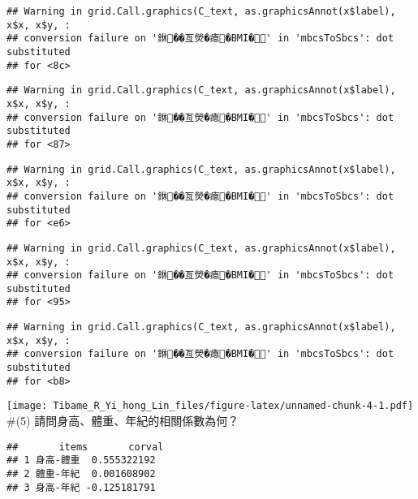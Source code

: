 \documentclass[
]{article}
\newenvironment{Shaded}{\begin{snugshade}}{\end{snugshade}}
\newcommand{\KeywordTok}[1]{\textcolor[rgb]{0.13,0.29,0.53}{\textbf{#1}}}
\newcommand{\NormalTok}[1]{#1}
\newcommand{\OperatorTok}[1]{\textcolor[rgb]{0.81,0.36,0.00}{\textbf{#1}}}
\newcommand{\StringTok}[1]{\textcolor[rgb]{0.31,0.60,0.02}{#1}}
\begin{document}
\begin{verbatim}
## Warning in grid.Call.graphics(C_text, as.graphicsAnnot(x$label), x$x, x$y, :
## conversion failure on '銝��亙熒�瘜�BMI�' in 'mbcsToSbcs': dot substituted
## for <8c>
\end{verbatim}

\begin{verbatim}
## Warning in grid.Call.graphics(C_text, as.graphicsAnnot(x$label), x$x, x$y, :
## conversion failure on '銝��亙熒�瘜�BMI�' in 'mbcsToSbcs': dot substituted
## for <87>
\end{verbatim}

\begin{verbatim}
## Warning in grid.Call.graphics(C_text, as.graphicsAnnot(x$label), x$x, x$y, :
## conversion failure on '銝��亙熒�瘜�BMI�' in 'mbcsToSbcs': dot substituted
## for <e6>
\end{verbatim}

\begin{verbatim}
## Warning in grid.Call.graphics(C_text, as.graphicsAnnot(x$label), x$x, x$y, :
## conversion failure on '銝��亙熒�瘜�BMI�' in 'mbcsToSbcs': dot substituted
## for <95>
\end{verbatim}

\begin{verbatim}
## Warning in grid.Call.graphics(C_text, as.graphicsAnnot(x$label), x$x, x$y, :
## conversion failure on '銝��亙熒�瘜�BMI�' in 'mbcsToSbcs': dot substituted
## for <b8>
\end{verbatim}

\texttt{[image: Tibame\_R\_Yi\_hong\_Lin\_files/figure-latex/unnamed-chunk-4-1.pdf]}
\#(5) 請問身高、體重、年紀的相關係數為何？

\begin{Shaded}
\end{Shaded}

\begin{verbatim}
##       items       corval
## 1 身高-體重  0.555322192
## 2 體重-年紀  0.001608902
## 3 身高-年紀 -0.125181791
\end{verbatim}
\end{document}

